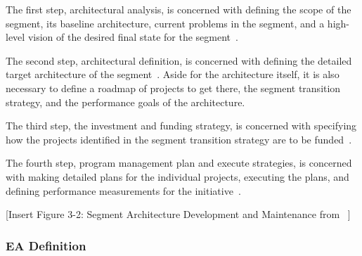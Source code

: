 
The first step, architectural analysis, is concerned with defining the scope of the segment, its baseline architecture, current problems in the segment, and a high-level vision of the desired final state for the segment~\cite{FederalEnterpriseArchitectureProgramManagementOffice2007}.

The second step, architectural definition, is concerned with defining the detailed target architecture of the segment~\cite{FederalEnterpriseArchitectureProgramManagementOffice2007}. Aside for the architecture itself, it is also necessary to define a roadmap of projects to get there, the segment transition strategy, and the performance goals of the architecture. 
  
The third step, the investment and funding strategy, is concerned with specifying how the projects identified in the segment transition strategy are to be funded~\cite{FederalEnterpriseArchitectureProgramManagementOffice2007}. 

The fourth step, program management plan and execute strategies, is concerned with making detailed plans for the individual projects, executing the plans, and defining performance measurements for the initiative~\cite{FederalEnterpriseArchitectureProgramManagementOffice2007}.

[Insert Figure 3-2: Segment Architecture Development and Maintenance from ~\cite{FederalEnterpriseArchitectureProgramManagementOffice2007}]

    
\subsubsection{EA Definition}

%
%


